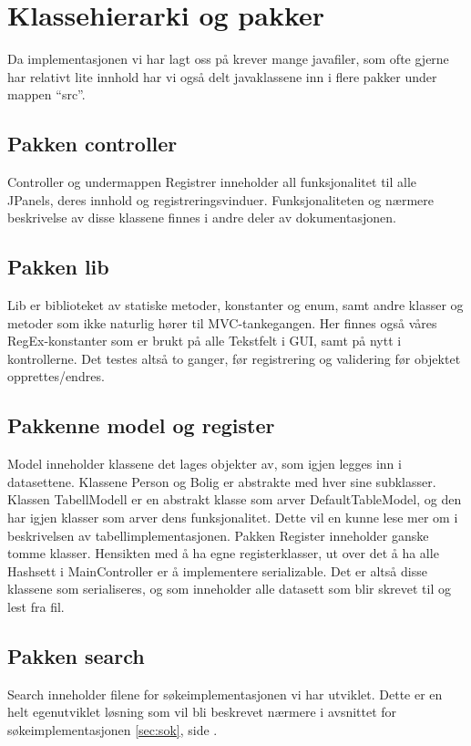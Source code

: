 \section{Klassehierarki og pakker}
Da implementasjonen vi har lagt oss på krever mange javafiler, som ofte gjerne har relativt lite innhold har vi også delt javaklassene inn i flere pakker under mappen “src”.

\subsection*{Pakken controller}
Controller og undermappen Registrer inneholder all funksjonalitet til alle JPanels, deres innhold og registreringsvinduer. Funksjonaliteten og nærmere beskrivelse av disse klassene finnes i andre deler av dokumentasjonen.

\subsection*{Pakken lib}
Lib er biblioteket av statiske metoder, konstanter og enum, samt andre klasser og metoder som ikke naturlig hører til MVC-tankegangen.
Her finnes også våres RegEx-konstanter som er brukt på alle Tekstfelt i GUI, samt på nytt i kontrollerne. Det testes altså to ganger, før registrering og validering før objektet opprettes/endres.

\subsection*{Pakkenne model og register}
Model inneholder klassene det lages objekter av, som igjen legges inn i datasettene. Klassene Person og Bolig er abstrakte med hver sine subklasser. Klassen TabellModell er en abstrakt klasse som arver DefaultTableModel, og den har igjen klasser som arver dens funksjonalitet. Dette vil en kunne lese mer om i beskrivelsen av tabellimplementasjonen.
Pakken Register inneholder ganske tomme klasser. Hensikten med å ha egne registerklasser, ut over det å ha alle Hashsett i MainController er å implementere serializable. Det er altså disse klassene som serialiseres, og som inneholder alle datasett som blir skrevet til og lest fra fil.

\subsection*{Pakken search}
Search inneholder filene for søkeimplementasjonen vi har utviklet. Dette er en helt egenutviklet løsning som vil bli beskrevet nærmere i avsnittet for søkeimplementasjonen \ref{sec:sok}, side \pageref{sec:sok}.


